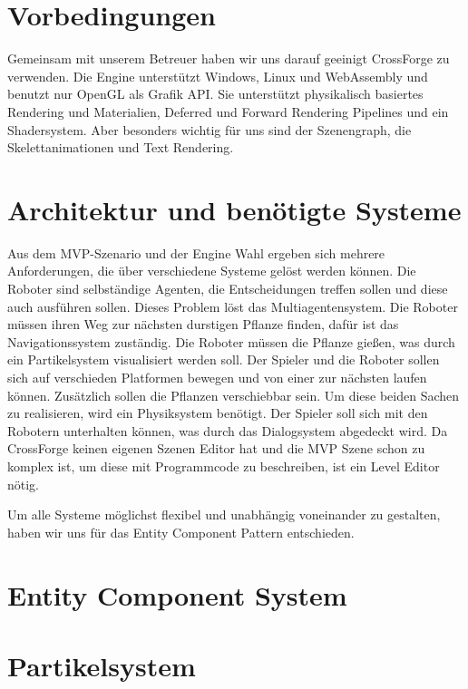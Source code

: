 
\section{Vorbedingungen}

Gemeinsam mit unserem Betreuer haben wir uns darauf geeinigt CrossForge zu verwenden. Die Engine unterstützt Windows, Linux und WebAssembly und benutzt nur OpenGL als Grafik API. Sie unterstützt physikalisch basiertes Rendering und Materialien, Deferred und Forward Rendering Pipelines und ein Shadersystem. Aber besonders wichtig für uns sind der Szenengraph, die Skelettanimationen und Text Rendering.

\section{Architektur und benötigte Systeme}

Aus dem MVP-Szenario und der Engine Wahl ergeben sich mehrere Anforderungen, die über verschiedene Systeme gelöst werden können. Die Roboter sind selbständige Agenten, die Entscheidungen treffen sollen und diese auch ausführen sollen. Dieses Problem löst das Multiagentensystem. Die Roboter müssen ihren Weg zur nächsten durstigen Pflanze finden, dafür ist das Navigationssystem zuständig. Die Roboter müssen die Pflanze gießen, was durch ein Partikelsystem visualisiert werden soll. Der Spieler und die Roboter sollen sich auf verschieden Platformen bewegen und von einer zur nächsten laufen können. Zusätzlich sollen die Pflanzen verschiebbar sein. Um diese beiden Sachen zu realisieren, wird ein Physiksystem benötigt.
Der Spieler soll sich mit den Robotern unterhalten können, was durch das Dialogsystem abgedeckt wird.
Da CrossForge keinen eigenen Szenen Editor hat und die MVP Szene schon zu komplex ist, um diese mit Programmcode zu beschreiben, ist ein Level Editor nötig.

Um alle Systeme möglichst flexibel und unabhängig voneinander zu gestalten, haben wir uns für das Entity Component Pattern entschieden.

\section{Entity Component System}

\section{Partikelsystem}


